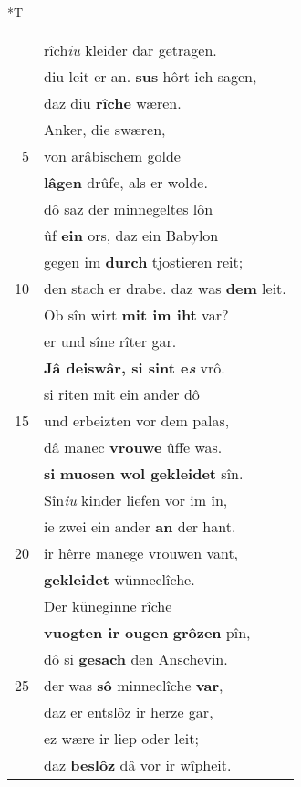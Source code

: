 \documentclass[8pt,a4paper,notitlepage]{article}
\begin{document}
\begin{table}[ht]
\begin{minipage}[t]{0.5\linewidth}
\end{minipage}
\hspace{0.5cm}
\begin{minipage}[t]{0.5\linewidth}
\small
\begin{center}*T
\end{center}
\begin{tabular}{rl}
 & rîch\textit{iu} kleider dar getragen.\\ 
 & diu leit er an. \textbf{sus} hôrt ich sagen,\\ 
 & daz diu \textbf{rîche} wæren.\\ 
 & Anker, die swæren,\\ 
5 & von arâbischem golde\\ 
 & \textbf{lâgen} drûfe, als er wolde.\\ 
 & dô saz der minnegeltes lôn\\ 
 & ûf \textbf{ein} ors, daz ein Babylon\\ 
 & gegen im \textbf{durch} tjostieren reit;\\ 
10 & den stach er drabe. daz was \textbf{dem} leit.\\ 
 & Ob sîn wirt \textbf{mit im iht} var?\\ 
 & er und sîne rîter gar.\\ 
 & \textbf{Jâ deiswâr, si sint e\textit{s}} vrô.\\ 
 & si riten mit ein ander dô\\ 
15 & und erbeizten vor dem palas,\\ 
 & dâ manec \textbf{vrouwe} ûffe was.\\ 
 & \textbf{si} \textbf{muosen wol gekleidet} sîn.\\ 
 & Sîn\textit{iu} kinder liefen vor im în,\\ 
 & ie zwei ein ander \textbf{an} der hant.\\ 
20 & ir hêrre manege vrouwen vant,\\ 
 & \textbf{gekleidet} wünneclîche.\\ 
 & Der küneginne rîche\\ 
 & \textbf{vuogten ir ougen} \textbf{grôzen} pîn,\\ 
 & dô si \textbf{gesach} den Anschevin.\\ 
25 & der was \textbf{sô} minneclîche \textbf{var},\\ 
 & daz er entslôz ir herze gar,\\ 
 & ez wære ir liep oder leit;\\ 
 & daz \textbf{beslôz} dâ vor ir wîpheit.\\ 

\end{tabular}
\end{minipage}
\end{table}
\end{document}

